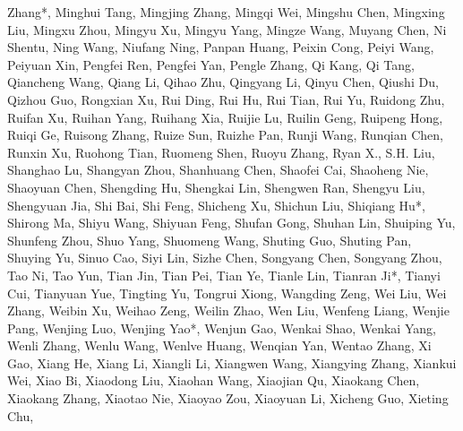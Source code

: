 Zhang*, Minghui Tang, Mingjing Zhang, Mingqi Wei, Mingshu Chen, Mingxing
Liu, Mingxu Zhou, Mingyu Xu, Mingyu Yang, Mingze Wang, Muyang Chen, Ni
Shentu, Ning Wang, Niufang Ning, Panpan Huang, Peixin Cong, Peiyi Wang,
Peiyuan Xin, Pengfei Ren, Pengfei Yan, Pengle Zhang, Qi Kang, Qi Tang,
Qiancheng Wang, Qiang Li, Qihao Zhu, Qingyang Li, Qinyu Chen, Qiushi Du,
Qizhou Guo, Rongxian Xu, Rui Ding, Rui Hu, Rui Tian, Rui Yu, Ruidong
Zhu, Ruifan Xu, Ruihan Yang, Ruihang Xia, Ruijie Lu, Ruilin Geng,
Ruipeng Hong, Ruiqi Ge, Ruisong Zhang, Ruize Sun, Ruizhe Pan, Runji
Wang, Runqian Chen, Runxin Xu, Ruohong Tian, Ruomeng Shen, Ruoyu Zhang,
Ryan X., S.H. Liu, Shanghao Lu, Shangyan Zhou, Shanhuang Chen, Shaofei
Cai, Shaoheng Nie, Shaoyuan Chen, Shengding Hu, Shengkai Lin, Shengwen
Ran, Shengyu Liu, Shengyuan Jia, Shi Bai, Shi Feng, Shicheng Xu, Shichun
Liu, Shiqiang Hu*, Shirong Ma, Shiyu Wang, Shiyuan Feng, Shufan Gong,
Shuhan Lin, Shuiping Yu, Shunfeng Zhou, Shuo Yang, Shuomeng Wang,
Shuting Guo, Shuting Pan, Shuying Yu, Sinuo Cao, Siyi Lin, Sizhe Chen,
Songyang Chen, Songyang Zhou, Tao Ni, Tao Yun, Tian Jin, Tian Pei, Tian
Ye, Tianle Lin, Tianran Ji*, Tianyi Cui, Tianyuan Yue, Tingting Yu,
Tongrui Xiong, Wangding Zeng, Wei Liu, Wei Zhang, Weibin Xu, Weihao
Zeng, Weilin Zhao, Wen Liu, Wenfeng Liang, Wenjie Pang, Wenjing Luo,
Wenjing Yao*, Wenjun Gao, Wenkai Shao, Wenkai Yang, Wenli Zhang, Wenlu
Wang, Wenlve Huang, Wenqian Yan, Wentao Zhang, Xi Gao, Xiang He, Xiang
Li, Xiangli Li, Xiangwen Wang, Xiangying Zhang, Xiankui Wei, Xiao Bi,
Xiaodong Liu, Xiaohan Wang, Xiaojian Qu, Xiaokang Chen, Xiaokang Zhang,
Xiaotao Nie, Xiaoyao Zou, Xiaoyuan Li, Xicheng Guo, Xieting Chu,



